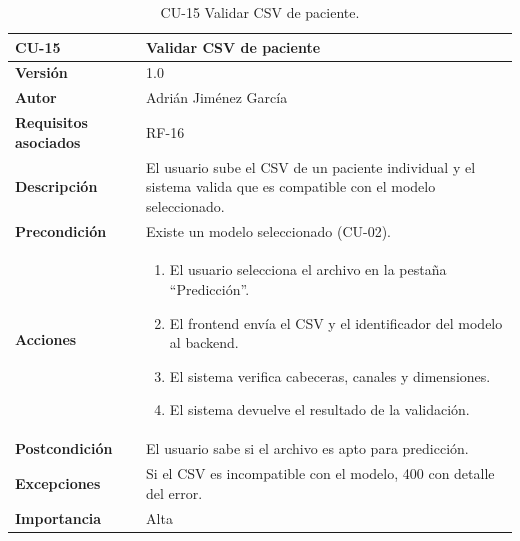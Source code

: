 \begin{table}[p]
	\centering
	\begin{tabularx}{\linewidth}{ p{} X }
		\toprule
		\textbf{CU-15}    & \textbf{Validar CSV de paciente}\\
		\toprule
		\textbf{Versión}              & 1.0 \\
		\textbf{Autor}                & Adrián Jiménez García \\
		\textbf{Requisitos asociados} & RF-16 \\
		\textbf{Descripción}          & El usuario sube el CSV de un paciente individual y el sistema valida que es compatible con el modelo seleccionado. \\
		\textbf{Precondición}         & Existe un modelo seleccionado (CU-02). \\
		\textbf{Acciones}             &
		\begin{enumerate}
			\def\labelenumi{\arabic{enumi}.}
			\tightlist
			\item El usuario selecciona el archivo en la pestaña ``Predicción''.
			\item El frontend envía el CSV y el identificador del modelo al backend.
			\item El sistema verifica cabeceras, canales y dimensiones.
			\item El sistema devuelve el resultado de la validación.
		\end{enumerate}\\
		\textbf{Postcondición}        & El usuario sabe si el archivo es apto para predicción. \\
		\textbf{Excepciones}          & Si el CSV es incompatible con el modelo, 400 con detalle del error. \\
		\textbf{Importancia}          & Alta \\
		\bottomrule
	\end{tabularx}
	\caption{CU-15 Validar CSV de paciente.}
\end{table}

